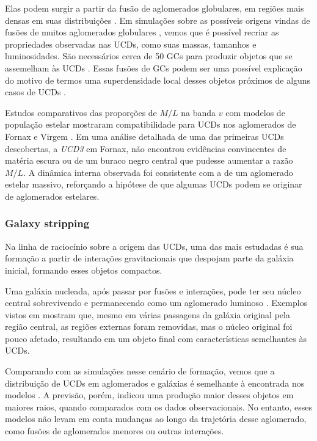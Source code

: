 Elas podem surgir a partir da fusão de aglomerados globulares, em regiões mais densas em suas distribuições \citep{Fellhauer_2002}. Em simulações sobre as possíveis origens vindas de fusões de muitos aglomerados globulares \citep{Goerdt_2008}, vemos que é possível recriar as propriedades observadas nas UCDs, como suas massas, tamanhos e luminosidades. São necessários cerca de 50 GCs para produzir objetos que se assemelham às UCDs \citep{Goerdt_2008}. Essas fusões de GCs podem ser uma possível explicação do motivo de termos uma superdensidade local desses objetos próximos de alguns casos de UCDs \citep{Voggel_2016}.

Estudos comparativos das proporções de $M/L$ na banda $v$ com modelos de população estelar mostraram compatibilidade para UCDs nos aglomerados de Fornax \citep{Hilker_2006} e Virgem \citep{Evstigneeva_2007}. Em uma análise detalhada de uma das primeiras UCDs descobertas, a \textit{UCD3} em Fornax, \cite{Frank_2011} não encontrou evidências convincentes de matéria escura ou de um buraco negro central que pudesse aumentar a razão $M/L$. A dinâmica interna observada foi consistente com a de um aglomerado estelar massivo, reforçando a hipótese de que algumas UCDs podem se originar de aglomerados estelares.

\subsubsection{Galaxy stripping}\label{subsubsec:Galaxy stripping}

Na linha de raciocínio sobre a origem das UCDs, uma das mais estudadas é sua formação a partir de interações gravitacionais que despojam parte da galáxia inicial, formando esses objetos compactos.

Uma galáxia nucleada, após passar por fusões e interações, pode ter seu núcleo central sobrevivendo e permanecendo como um aglomerado luminoso \citep{Bassino_1994}. Exemplos vistos em \cite{Bekki_2001} mostram que, mesmo em várias passagens da galáxia original pela região central, as regiões externas foram removidas, mas o núcleo original foi pouco afetado, resultando em um objeto final com características semelhantes às UCDs.

Comparando com as simulações nesse cenário de formação, vemos que a distribuição de UCDs em aglomerados e galáxias é semelhante à encontrada nos modelos \citep{Thomas_2008}. A previsão, porém, indicou uma produção maior desses objetos em maiores raios, quando comparados com os dados observacionais. No entanto, esses modelos não levam em conta mudanças ao longo da trajetória desse aglomerado, como fusões de aglomerados menores ou outras interações.

